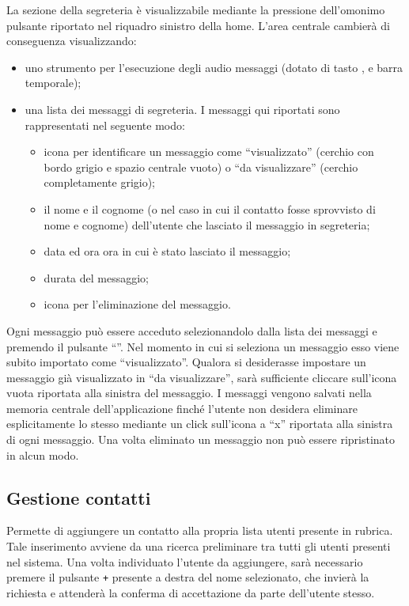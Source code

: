 La sezione della segreteria è visualizzabile mediante la pressione dell'omonimo pulsante riportato nel riquadro sinistro della home. L'area centrale cambierà di conseguenza visualizzando:
	\begin{itemize}
		\item uno strumento per l'esecuzione degli audio messaggi (dotato di tasto ,  e barra temporale);
		\item una lista dei messaggi di segreteria. I messaggi qui riportati sono rappresentati nel seguente modo:
			\begin{itemize}
				\item icona per identificare un messaggio come ``visualizzato'' (cerchio con bordo grigio e spazio centrale vuoto) o ``da visualizzare'' (cerchio completamente grigio);
				\item il nome e il cognome (o  nel caso in cui il contatto fosse sprovvisto di nome e cognome) dell'utente che lasciato il messaggio in segreteria;
				\item data ed ora ora in cui è stato lasciato il messaggio;
				\item durata del messaggio;
				\item icona per l'eliminazione del messaggio.
			\end{itemize}
	\end{itemize}	 

Ogni messaggio può essere acceduto selezionandolo dalla lista dei messaggi e premendo il pulsante ``''. Nel momento in cui si seleziona un messaggio esso viene subito importato come ``visualizzato''. Qualora si desiderasse impostare un messaggio già visualizzato in ``da visualizzare'', sarà sufficiente cliccare sull'icona vuota riportata alla sinistra del messaggio.
I messaggi vengono salvati nella memoria centrale dell'applicazione \caName{} finché l'utente non desidera eliminare esplicitamente lo stesso mediante un click sull'icona a ``x'' riportata alla sinistra di ogni messaggio. Una volta eliminato un messaggio non può essere ripristinato in alcun modo.



\subsection{Gestione contatti}
Permette di aggiungere un contatto alla propria lista utenti presente in rubrica. Tale inserimento avviene da una ricerca preliminare tra tutti gli utenti presenti nel sistema. Una volta individuato l'utente da aggiungere, sarà necessario premere il pulsante \texttt{+} presente a destra del nome selezionato, che invierà la richiesta e attenderà la conferma di accettazione da parte dell'utente stesso.


